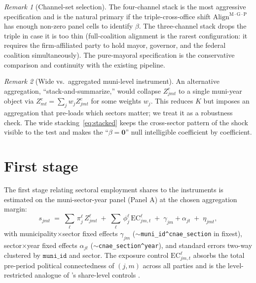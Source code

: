 \documentclass{article}
\newcommand{\Align}{\mathrm{Align}}
\newcommand{\EC}{\mathrm{EC}}
\newcommand{\bzero}{\mathbf{0}}
\theoremstyle{plain}
\theoremstyle{definition}
\theoremstyle{remark}
\newtheorem{remark}{Remark}
\begin{document}
\begin{remark}[Channel-set selection]\label{rem:channel-set}
The four-channel stack is the most aggressive specification and is the
natural primary if the triple-cross-office shift $\Align^{\mathrm{M{\cdot}G{\cdot}P}}$
has enough non-zero panel cells to identify $\beta$. The three-channel
stack drops the triple in case it is too thin (full-coalition alignment
is the rarest configuration: it requires the firm-affiliated party to
hold mayor, governor, and the federal coalition simultaneously). The
pure-mayoral specification is the conservative comparison and continuity
with the existing pipeline.
\end{remark}

\begin{remark}[Wide vs.\ aggregated muni-level instrument]
An alternative aggregation, ``stack-and-summarize,'' would collapse
$Z^{c}_{jmt}$ to a single muni-year object via
$Z^{c}_{mt}=\sum_j w_j Z^{c}_{jmt}$ for some weights $w_j$. This reduces
$K$ but imposes an aggregation that pre-loads which sectors matter; we
treat it as a robustness check. The wide stacking~\eqref{eq:stacked}
keeps the cross-sector pattern of the shock visible to the test and
makes the ``$\beta=\bzero$'' null intelligible coefficient by coefficient.
\end{remark}

\section{First stage}\label{sec:firststage}

The first stage relating sectoral employment shares to the instruments is
estimated on the muni-sector-year panel (Panel A) at the chosen aggregation
margin:
\begin{equation}\label{eq:fs}
  s_{jmt}
  \;=\;
  \sum_{\ell}\,\pi^{\ell}_j\, Z^{\ell}_{jmt}
  \;+\;
  \sum_{\ell}\,\phi^{\ell}_j\,\EC^{\ell}_{jm,t}
  \;+\;
  \gamma_{jm} + \alpha_{jt}
  \;+\;
  \eta_{jmt},
\end{equation}
with municipality$\times$sector fixed effects $\gamma_{jm}$
($\sim$\texttt{muni\_id\^{}cnae\_section} in fixest), sector$\times$year fixed
effects $\alpha_{jt}$ ($\sim$\texttt{cnae\_section\^{}year}), and standard
errors two-way clustered by $\texttt{muni\_id}$ and sector. The exposure
control $\EC^{\ell}_{jm,t}$ absorbs the total pre-period political
connectedness of $(j,m)$ across all parties and is the level-restricted
analogue of \citeauthor{goldsmith2020bartik}'s share-level controls
\citep{goldsmith2020bartik}.
\end{document}
